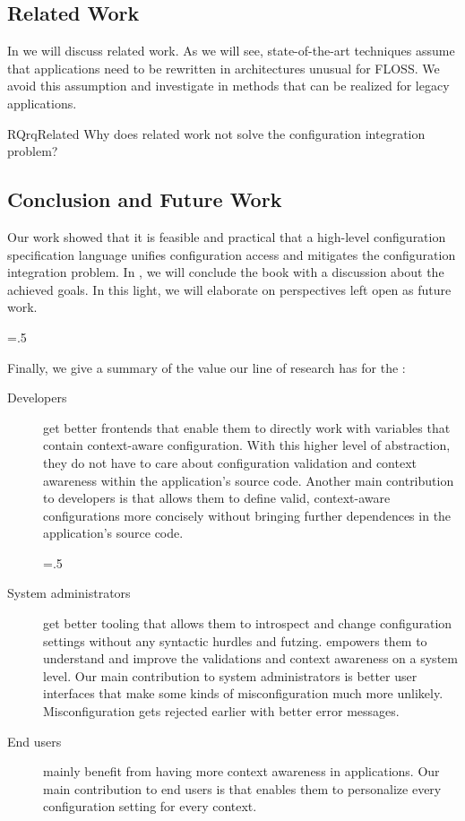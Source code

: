 \subsection{Related Work}

In  we will discuss related work.
As we will see, state-of-the-art techniques assume that applications need to be rewritten in architectures unusual for FLOSS.
We avoid this assumption and investigate in methods that can be realized for legacy applications.

\begin{restatable}{RQ}{rqRelated}
Why does related work not solve the configuration integration problem?
\end{restatable}

\subsection{Conclusion and Future Work}

Our work showed that it is feasible and practical that a high-level configuration specification language unifies configuration access and mitigates the configuration integration problem.
In , we will conclude the book with a discussion about the achieved goals.
In this light, we will elaborate on perspectives left open as future work.%
{\parfillskip=0pt \emergencystretch=.5\textwidth \par}

\pagebreak

Finally, we give a summary of the value our line of research has for the :
\begin{description}
\item[Developers] get better frontends that enable them to directly work with variables that contain context-aware configuration.
With this higher level of abstraction, they do not have to care about configuration validation and context awareness within the application's source code.
Another main contribution to developers is  that allows them to define valid, context-aware configurations more concisely without bringing further dependences in the application's source code.%
{\parfillskip=0pt \emergencystretch=.5\textwidth \par}


\item[System administrators] get better tooling that allows them to introspect and change configuration settings without any syntactic hurdles and futzing.
 empowers them to understand and improve the validations and context awareness on a system level.
Our main contribution to system administrators is better user interfaces that make some kinds of misconfiguration much more unlikely.
Misconfiguration gets rejected earlier with better error messages.

\item[End users] mainly benefit from having more context awareness in applications.
Our main contribution to end users is that \elektra{} enables them to personalize every configuration setting for every context.
\end{description}
